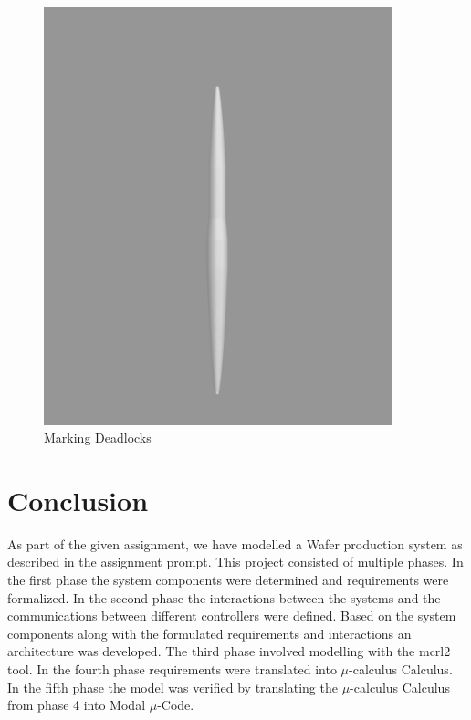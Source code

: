 \documentclass[a4paper,12pt]{article}
\begin{document}
\begin{figure}[ht]
\begin{minipage}{0.45\textwidth}
			\includegraphics[width=0.9\textwidth]{Deadlockfree.png} 
			\caption{Marking Deadlocks}
			\label{fig:deadlockfree}
		\end{minipage}
	\end{figure}
	\newpage
	\section{Conclusion}
	As part of the given assignment, we have modelled a Wafer production system as described in the assignment prompt. This project consisted of multiple phases. In the first phase the system components were determined and requirements were formalized. In the second phase the interactions between the systems and the communications between different controllers were defined. Based on the system components along with the formulated requirements and interactions an architecture was developed. The third phase involved modelling with the mcrl2 tool. In the fourth phase requirements were translated into $\mu$-calculus Calculus. In the fifth phase the model was verified by translating the $\mu$-calculus Calculus from phase 4 into Modal $\mu$-Code. 
	
	\newpage
	\appendix
\end{document}
